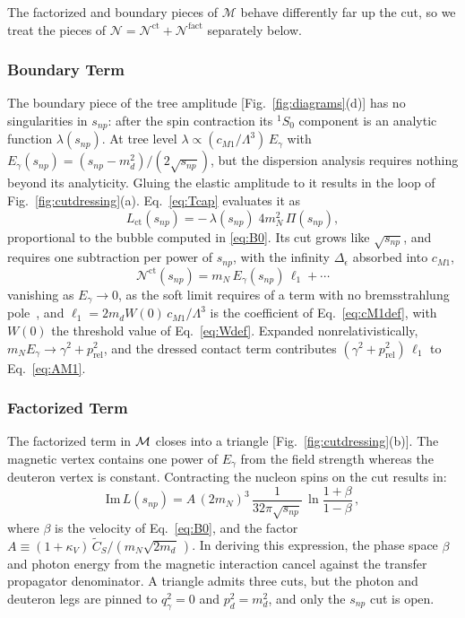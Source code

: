 \documentclass[
  aps,prd,twocolumn,nofootinbib,superscriptaddress,
  longbibliography,floatfix,preprintnumbers
]{revtex4-2}
\newcommand{\prel}{p_{\mathrm{rel}}}
\newcommand{\Egam}{E_{\gamma}}
\newcommand{\kappaV}{\kappa_{V}}
\newcommand{\Mone}{M1}
\newcommand{\CSv}{\tilde{C}_{S}}
\begin{document}
The factorized and boundary pieces of $\mathcal{M}$ behave differently
far up the cut, so we treat the pieces of
$\mathcal{N} = \mathcal{N}^{\mathrm{ct}} + \mathcal{N}^{\mathrm{fact}}$ separately below.

\subsubsection{Boundary Term}

The boundary piece of the tree amplitude [Fig.~\ref{fig:diagrams}(d)]
has no singularities in $s_{np}$: after the spin contraction its
$^{1}S_{0}$ component is an analytic function $\lambda(s_{np})$. At tree
level $\lambda \propto (c_{\Mone}/\Lambda^{3})\,\Egam$ with
$\Egam(s_{np}) = (s_{np}-m_{d}^{2})/(2\sqrt{s_{np}})$, but the
dispersion analysis requires nothing beyond its analyticity. 
Gluing the elastic amplitude to it
results in the loop of Fig.~\ref{fig:cutdressing}(a).
Eq.~\eqref{eq:Tcap} evaluates it as
\begin{equation}
  L_{\mathrm{ct}}(s_{np})
  = -\,\lambda(s_{np})\;4m_{N}^{2}\,\Pi(s_{np}),
  \label{eq:Lct}
\end{equation}
proportional to the bubble computed in \eqref{eq:B0}.  Its
cut grows like $\sqrt{s_{np}}$, and requires one subtraction per power
of $s_{np}$, with the infinity $\Delta_{\epsilon}$ absorbed into $c_{\Mone}$,
\begin{equation}
  \mathcal{N}^{\mathrm{ct}}(s_{np})
  = m_{N}\,\Egam(s_{np})\,\ell_{1} + \cdots
  \label{eq:Kct}
\end{equation}
vanishing as $\Egam\to0$, as the soft limit requires of a term with no bremsstrahlung pole~\cite{Low:1958sn},
and $\ell_{1}=2m_{d}W(0)\,c_{\Mone}/\Lambda^{3}$ is the coefficient of
Eq.~\eqref{eq:cM1def}, with $W(0)$ the threshold value of Eq.~\eqref{eq:Wdef}.
Expanded nonrelativistically,
$m_{N}\Egam\to\gamma^{2}+\prel^{2}$, and the dressed contact term contributes
$(\gamma^{2}+\prel^{2})\,\ell_{1}$ to Eq.~\eqref{eq:AM1}.

\subsubsection{Factorized Term}

The factorized term in ${\cal M}$ closes into a triangle [Fig.~\ref{fig:cutdressing}(b)]. 
The magnetic vertex contains one power of $\Egam$ from the field
strength whereas the deuteron vertex is constant.  Contracting the nucleon
spins on the cut results in:
\begin{equation}
  \mathrm{Im}\,L(s_{np})
  = A\,(2m_{N})^{3}\,\frac{1}{32\pi\sqrt{s_{np}}}\,
    \ln\frac{1+\beta}{1-\beta}\,,
  \label{eq:ImCrel}
\end{equation}
where $\beta$ is the velocity of Eq.~\eqref{eq:B0}, and the factor
$A \equiv (1+\kappaV)\,\CSv/(m_{N}\sqrt{2m_{d}}\,)$. 
In deriving this expression, the phase space $\beta$ and photon energy from the magnetic interaction
cancel against the transfer propagator denominator. 
A triangle admits three cuts, but the photon and deuteron legs are pinned to $q_{\gamma}^{2}=0$
and $p_{d}^{2}=m_{d}^{2}$, and only the $s_{np}$ cut is open.
\end{document}
